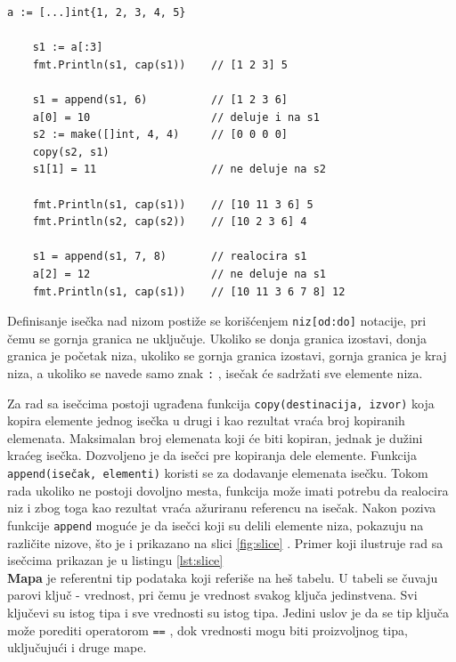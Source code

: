 \documentclass[12pt,oneside]{memoir}
\begin{document}
\begin{center}
\begin{lstlisting}[caption=Primer koji demonstrira rad sa isečcima, label={lst:slice},  backgroundcolor=\color{background}]
	a := [...]int{1, 2, 3, 4, 5}
	
	s1 := a[:3] 				
	fmt.Println(s1, cap(s1))	// [1 2 3] 5
	
	s1 = append(s1, 6) 			// [1 2 3 6]
	a[0] = 10					// deluje i na s1
	s2 := make([]int, 4, 4)		// [0 0 0 0] 
	copy(s2, s1)
	s1[1] = 11					// ne deluje na s2
	
	fmt.Println(s1, cap(s1)) 	// [10 11 3 6] 5
	fmt.Println(s2, cap(s2)) 	// [10 2 3 6] 4
	
	s1 = append(s1, 7, 8)		// realocira s1
	a[2] = 12					// ne deluje na s1
	fmt.Println(s1, cap(s1))	// [10 11 3 6 7 8] 12
\end{lstlisting}
\end{center}

Definisanje isečka nad nizom postiže se korišćenjem \texttt{niz[od:do]} notacije, pri čemu se gornja granica ne uključuje. Ukoliko se donja granica izostavi, donja granica je početak niza, ukoliko se gornja granica izostavi, gornja granica je kraj niza, a ukoliko se navede samo znak \texttt{:} , isečak će sadržati sve elemente niza. 

Za rad sa isečcima postoji ugrađena funkcija \texttt{copy(destinacija, izvor)} koja kopira elemente jednog isečka u drugi i kao rezultat vraća broj kopiranih elemenata. Maksimalan broj elemenata koji će biti kopiran, jednak je dužini kraćeg isečka. Dozvoljeno je da isečci pre kopiranja dele elemente. Funkcija \texttt{append(isečak, elementi)} koristi se za dodavanje elemenata isečku. Tokom rada ukoliko ne postoji dovoljno mesta, funkcija može imati potrebu da realocira niz i zbog toga kao rezultat vraća ažuriranu referencu na isečak. Nakon poziva funkcije \texttt{append} moguće je da isečci koji su delili elemente niza, pokazuju na različite nizove, što je i prikazano na slici \ref{fig:slice} \cite{bookGoProg}. Primer koji ilustruje rad sa isečcima prikazan je u listingu \ref{lst:slice}
\\

\textbf{Mapa} je referentni tip podataka koji referiše na heš tabelu. U tabeli se čuvaju parovi ključ - vrednost, pri čemu je vrednost svakog ključa jedinstvena. Svi ključevi su istog tipa i sve vrednosti su istog tipa. Jedini uslov je da se tip ključa može porediti operatorom \texttt{==} , dok vrednosti mogu biti proizvoljnog tipa, uključujući i druge mape. 
\end{document}
